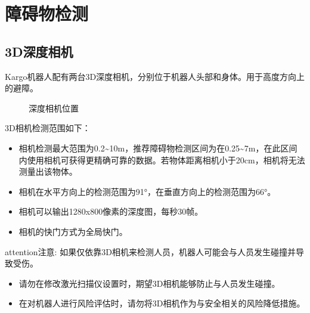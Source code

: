\documentclass[a4paper,11pt,english,openany,oneside]{sphinxmanual}
\begin{document}
\section{障碍物检测}
\label{\detokenize{07 _u6280_u672f_u89c4_u683c:id32}}\label{\detokenize{07 _u6280_u672f_u89c4_u683c:id33}}

\subsection{3D深度相机}
\label{\detokenize{07 _u6280_u672f_u89c4_u683c:d}}\label{\detokenize{07 _u6280_u672f_u89c4_u683c:id34}}
\sphinxAtStartPar
Kargo机器人配有两台3D深度相机，分别位于机器人头部和身体。用于高度方向上的避障。

\begin{figure}[H]
\centering
\capstart

\noindent{}
\caption{深度相机位置}\label{\detokenize{07 _u6280_u672f_u89c4_u683c:id74}}\end{figure}



\sphinxAtStartPar
3D相机检测范围如下：
\begin{itemize}
\item {} 
\sphinxAtStartPar
相机检测最大范围为0.2\textasciitilde{}10m，推荐障碍物检测区间为在0.25\textasciitilde{}7m，在此区间内使用相机可获得更精确可靠的数据。若物体距离相机小于20cm，相机将无法测量出该物体。

\item {} 
\sphinxAtStartPar
相机在水平方向上的检测范围为91°，在垂直方向上的检测范围为66°。

\item {} 
\sphinxAtStartPar
相机可以输出1280x800像素的深度图，每秒30帧。

\item {} 
\sphinxAtStartPar
相机的快门方式为全局快门。

\end{itemize}

\begin{sphinxadmonition}{attention}{注意:}
\sphinxAtStartPar
如果仅依靠3D相机来检测人员，机器人可能会与人员发生碰撞并导致受伤。
\begin{itemize}
\item {} 
\sphinxAtStartPar
请勿在修改激光扫描仪设置时，期望3D相机能够防止与人员发生碰撞。

\item {} 
\sphinxAtStartPar
在对机器人进行风险评估时，请勿将3D相机作为与安全相关的风险降低措施。

\end{itemize}
\end{sphinxadmonition}
\end{document}
